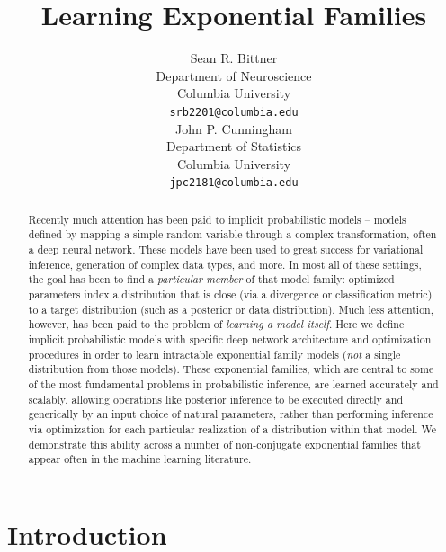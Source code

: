 \documentclass{article}
\title{Learning Exponential Families}
\author{
  Sean R. Bittner \\ %
  Department of Neuroscience\\
  Columbia University\\
  \texttt{srb2201@columbia.edu} \\
 \And
John P. Cunningham \\
Department of Statistics\\
  Columbia University\\
 \texttt{jpc2181@columbia.edu} \\
}
\begin{document}

\maketitle

\begin{abstract}
  
Recently much attention has been paid to implicit probabilistic models -- models defined by mapping a simple random variable through a complex transformation, often a deep neural network.  These models have been used to great success for variational inference, generation of complex data types, and more.  In most all of these settings, the goal has been to find a \emph{particular member} of that model family: optimized parameters index a distribution that is close (via a divergence or classification metric) to a target distribution (such as a posterior or data distribution).  Much less attention, however, has been paid to the problem of \emph{learning a model itself}.   Here we define implicit probabilistic models with specific deep network architecture and optimization procedures in order to learn intractable exponential family models (\emph{not} a single distribution from those models).  These exponential families, which are central to some of the most fundamental problems in probabilistic inference, are learned accurately and scalably, allowing operations like posterior inference to be executed directly and generically by an input choice of natural parameters, rather than performing inference via optimization for each particular realization of a distribution within that model.  We demonstrate this ability across a number of non-conjugate exponential families that appear often in the machine learning literature.
  
\end{abstract}

\section{Introduction}
\end{document}
